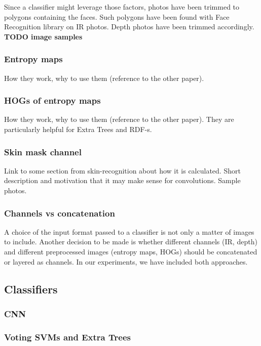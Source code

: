         Since a classifier might leverage those factors, photos have been
        trimmed to polygons containing the faces. Such polygons have been
        found with Face Recognition library \cite{facerecog} on IR photos.
        Depth photos have been trimmed accordingly.
        \textbf{TODO image samples}

        \subsubsection*{Entropy maps}
        How they work, why to use them (reference to the other paper).

        \subsubsection*{HOGs of entropy maps}
        How they work, why to use them (reference to the other paper). They
        are particularly helpful for Extra Trees and RDF-s.

        \subsubsection*{Skin mask channel}
        Link to some section from skin-recognition about how it is calculated.
        Short description and motivation that it may make sense for
        convolutions.
        Sample photos.

        \subsubsection*{Channels vs concatenation}
        A choice of the input format passed to a classifier is not only a matter
        of images to include. Another decision to be made is whether different
        channels (IR, depth) and different preprocessed images (entropy maps,
        HOGs) should be concatenated or layered as channels. In our experiments,
        we have included both approaches.


    \subsection{Classifiers}
        \subsubsection*{CNN}

        \subsubsection*{Voting SVMs and Extra Trees}

